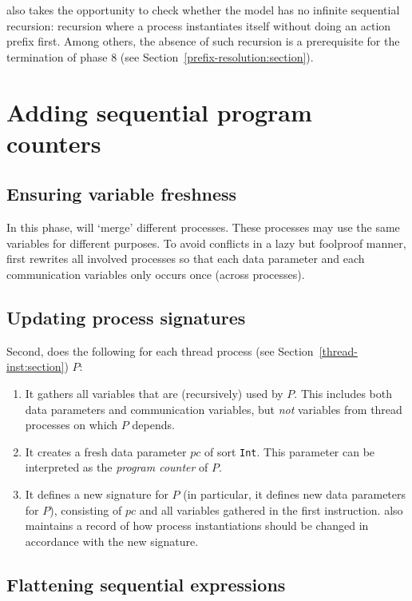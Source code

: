 \lpeq{} also takes the opportunity to check whether the model has no infinite sequential recursion: recursion where a process instantiates itself without doing an action prefix first.
Among others, the absence of such recursion is a prerequisite for the termination of phase 8 (see Section~\ref{prefix-resolution:section}).

\section{Adding sequential program counters}

\subsection{Ensuring variable freshness}

In this phase, \lpeq{} will `merge' different processes.
These processes may use the same variables for different purposes.
To avoid conflicts in a lazy but foolproof manner, \lpeq{} first rewrites all involved processes so that each data parameter and each communication variables only occurs once (across processes).

\subsection{Updating process signatures}

Second, \lpeq{} does the following for each thread process (see Section~\ref{thread-inst:section}) $P$:
\begin{enumerate}[1.]
\item It gathers all variables that are (recursively) used by $P$.
This includes both data parameters and communication variables, but \emph{not} variables from thread processes on which $P$ depends.
\item It creates a fresh data parameter $\textit{pc}$ of sort \texttt{Int}.
This parameter can be interpreted as the \emph{program counter} of $P$.
\item It defines a new signature for $P$ (in particular, it defines new data parameters for $P$), consisting of $\textit{pc}$ and all variables gathered in the first instruction.
\lpeq{} also maintains a record of how process instantiations should be changed in accordance with the new signature.
\end{enumerate}

\subsection{Flattening sequential expressions} \label{flattenseqexprs:section}

